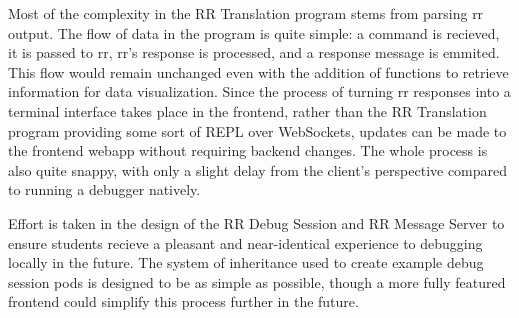 \documentclass[12pt]{article}
\begin{document}
Most of the complexity in the RR Translation program stems from
parsing rr output.  The flow of data in the program is quite simple: a
command is recieved, it is passed to rr, rr's response is processed,
and a response message is emmited.  This flow would remain unchanged
even with the addition of functions to retrieve information for data
visualization.  Since the process of turning rr responses into a
terminal interface takes place in the frontend, rather than the RR
Translation program providing some sort of REPL over WebSockets,
updates can be made to the frontend webapp without requiring backend
changes.  The whole process is also quite snappy, with only a slight
delay from the client's perspective compared to running a debugger
natively.
\par

Effort is taken in the design of the RR Debug Session and RR Message
Server to ensure students recieve a pleasant and near-identical
experience to debugging locally in the future.  The system of
inheritance used to create example debug session pods is designed to
be as simple as possible, though a more fully featured frontend could
simplify this process further in the future.





\end{document}

